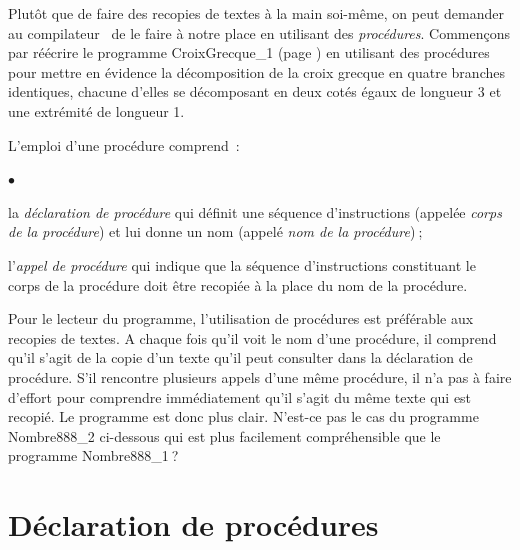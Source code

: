 Plutôt que de faire des recopies de textes à la main soi-même, on peut 
demander au compilateur \pascal\ de le faire à  notre place en utilisant 
des {\em procédures}. Commençons par réécrire le programme 
{\idt CroixGrecque\_1} (page \pageref{prog:CroixGrecque_1}) en uti\-li\-sant des procédures pour mettre en 
évidence la décomposition de la croix grecque en 
quatre bran\-ches identiques, chacune d'elles se décomposant en deux 
cotés égaux de lon\-gueur 3 et une extrémité de lon\-gueur 1.

\newpage
\vspace*{3cm}%
\vspace*{-3cm}%


\noindent L'emploi d'une procédure comprend~:
\begin{list}{$\scriptscriptstyle\bullet$}{
}
\item la {\em déclaration de procédure} qui définit une séquence 
d'instructions (appelée {\em corps de la procédure}) et lui donne un 
nom (appelé {\em nom de la procédure})$\:$;
\item l'{\em appel de procédure} qui indique que la séquence 
d'instructions cons\-ti\-tuant le corps de la procédure doit être recopiée 
à la place du nom de la procédure.
\end{list}

\noindent Pour le lecteur du programme, l'utilisation de procédures est 
préférable aux recopies de textes. A chaque fois qu'il voit le
nom d'une procédure, il comprend qu'il s'agit de la copie d'un texte
qu'il peut consulter dans la déclaration de procédure. S'il rencontre
plusieurs appels d'une même procédure, il n'a pas à faire d'effort 
pour comprendre immédiatement qu'il s'agit du même texte qui est
recopié. Le programme est donc plus clair. N'est-ce pas le cas du
programme {\idt Nombre888\_2} ci-dessous qui est plus facilement 
compréhensible que le programme {\idt Nombre888\_1}$\:$? 

\vspace{\baselineskip}
\vspace*{2cm}%
\vspace*{-2cm}%


\section{Déclaration de procédures} 

